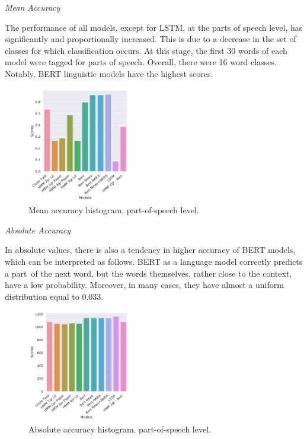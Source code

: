 \documentclass[a4paper]{article}
\newcommand{\head}[1]{\vspace{0.5em}\emph{#1}\vspace{0.25em}}
\begin{document}
\head{Mean Accuracy}

The performance of all models, except for LSTM, at the parts of speech level, has significantly and proportionally increased. This is due to a decrease in the set of classes for which classification occurs. At this stage, the first 30 words of each model were tagged for parts of speech. Overall, there were 16 word classes. Notably, BERT linguistic models have the highest scores.

\begin{figure}
\caption{Mean accuracy histogram, part-of-speech level.}
\label{fig:mean-accuracy-hist-pos}
\centering
\includegraphics[width=0.4\textwidth]{figures/pdf/mean-accuracy-hist-pos.pdf}
\end{figure}

\head{Absolute Accuracy}

In absolute values, there is also a tendency in higher accuracy of BERT models, which can be interpreted as follows. BERT as a language model correctly predicts a part of the next word, but the words themselves, rather close to the context, have a low probability. Moreover, in many cases, they have almost a uniform distribution equal to 0.033.

\begin{figure}
\caption{Absolute accuracy histogram, part-of-speech level.}
\label{fig:abs-accuracy-hist-pos}
\centering
\includegraphics[width=0.4\textwidth]{figures/pdf/abs-accuracy-hist-pos.pdf}
\end{figure}
\end{document}

